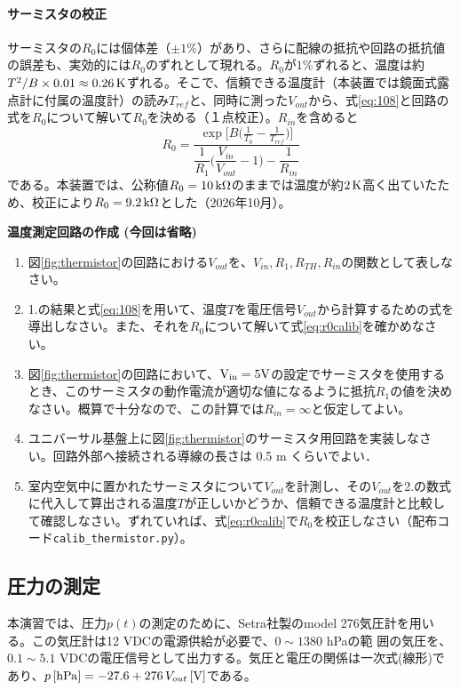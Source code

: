 \documentclass{ltjsarticle}
\begin{document}
\paragraph{サーミスタの校正}
サーミスタの$R_{0}$には個体差（$\pm1\%$）があり、さらに配線の抵抗や回路の抵抗値の誤差も、実効的には$R_{0}$のずれとして現れる。$R_{0}$が$1\%$ずれると、温度は約$T^{2}/B\times0.01\approx0.26\,\rm K$ずれる。そこで、信頼できる温度計（本装置では鏡面式露点計に付属の温度計）の読み$T_{ref}$と、同時に測った$V_{out}$から、式\eqref{eq:108}と回路の式を$R_{0}$について解いて$R_{0}$を決める（１点校正）。$R_{in}$を含めると
\begin{equation}\label{eq:r0calib}
R_{0}=\frac{\exp{\big [}B{\big (}\frac{1}{T_{0}}-\frac{1}{T_{ref}}{\big )}{\big ]}}{\dfrac{1}{R_{1}}{\Big (}\dfrac{V_{in}}{V_{out}}-1{\Big )}-\dfrac{1}{R_{in}}}
\end{equation}
である。本装置では、公称値$R_{0}=10\,\rm k\Omega$のままでは温度が約$2\,\rm K$高く出ていたため、校正により$R_{0}=9.2\,\rm k\Omega$とした（2026年10月）。
\leavevmode \\
\begin{itembox}[l]{\bf{温度測定回路の作成 (今回は省略)}}
\begin{enumerate}
\item 図\ref{fig:thermistor}の回路における$V_{out}$を、$V_{in},R_{1},R_{TH},R_{in}$の関数として表しなさい。
\item 1.の結果と式\eqref{eq:108}を用いて、温度$T$を電圧信号$V_{out}$から計算するための式を導出しなさい。また、それを$R_{0}$について解いて式\eqref{eq:r0calib}を確かめなさい。
\item 図\ref{fig:thermistor}の回路において、$\rm{V_{in}} = 5 \rm{V}$の設定でサーミスタを使用するとき、このサーミスタの動作電流が適切な値になるように抵抗$R_{1}$の値を決めなさい。概算で十分なので、この計算では$R_{in}=\infty$と仮定してよい。
\item ユニバーサル基盤上に図\ref{fig:thermistor}のサーミスタ用回路を実装しなさい。回路外部へ接続される導線の長さは 0.5 m くらいでよい．
\item 室内空気中に置かれたサーミスタについて$V_{out}$を計測し、その$V_{out}$を2.の数式に代入して算出される温度$T$が正しいかどうか、信頼できる温度計と比較して確認しなさい。ずれていれば、式\eqref{eq:r0calib}で$R_{0}$を校正しなさい（配布コード\verb|calib_thermistor.py|）。
\end{enumerate}
\end{itembox}

\subsection{圧力の測定}\label{sec:pressure}
本演習では、圧力$p(t)$の測定のために、Setra社製のmodel 276気圧計を用いる。この気圧計は12 VDCの電源供給が必要で、$0\sim1380$ hPaの範
囲の気圧を、$0.1\sim5.1$ VDCの電圧信号として出力する。気圧と電圧の関係は一次式(線形)であり、$p\,[{\rm hPa}]=-27.6+276\,V_{out}\,[{\rm V}]$である。
\end{document}
